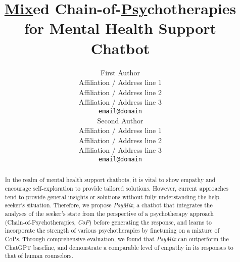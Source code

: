 \documentclass[11pt]{article}
\title{\uline{Mix}ed Chain-of-\uline{Psy}chotherapies for Mental Health Support Chatbot}
\author{First Author \\
  Affiliation / Address line 1 \\
  Affiliation / Address line 2 \\
  Affiliation / Address line 3 \\
  \texttt{email@domain} \\\And
  Second Author \\
  Affiliation / Address line 1 \\
  Affiliation / Address line 2 \\
  Affiliation / Address line 3 \\
  \texttt{email@domain} \\}
\newcommand{\KZ}[1]{\textcolor{blue}{(Kenny: #1})}
\newcommand{\MY}[1]{\textcolor{orange}{(Mengyue: #1})}
\begin{document}
\maketitle
\begin{abstract}
In the realm of mental health support chatbots, it is vital to show empathy and encourage self-exploration to provide tailored solutions. However, current approaches tend to provide general insights or solutions without fully understanding the help-seeker's situation. Therefore, we propose \textit{PsyMix}, a chatbot that integrates the analyses of the seeker's state from the perspective of a psychotherapy approach (Chain-of-Psychotherapies, \textit{CoP}) before generating the response, and learns to incorporate the strength of various psychotherapies by finetuning on a mixture of CoPs. Through comprehensive evaluation, we found that \textit{PsyMix} can outperform the ChatGPT baseline, and demonstrate a comparable level of empathy in its responses to that of human counselors.
\end{abstract}









%


\appendix




\end{document}
